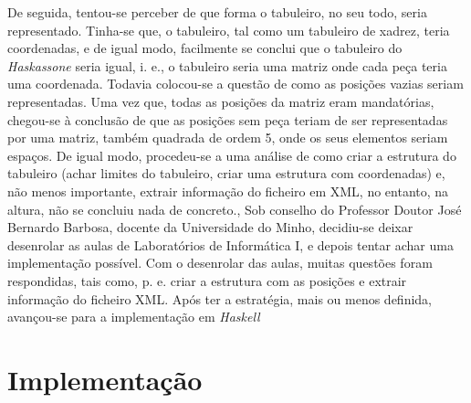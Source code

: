 De seguida,  tentou-se perceber de  que forma o  tabuleiro, no seu todo,  seria representado. Tinha-se  que, o
tabuleiro, tal como  um tabuleiro de xadrez, teria coordenadas,  e de igual modo, facilmente se  conclui que o
tabuleiro do  \emph{Haskassone} seria igual,  i. e., o  tabuleiro seria uma matriz  onde cada peça  teria uma
coordenada. Todavia colocou-se  a questão de como  as posições vazias seriam representadas.  Uma vez que,
todas as posições da matriz eram mandatórias, chegou-se à conclusão de que as posições sem peça teriam
de ser representadas por uma  matriz, também quadrada de ordem 5, onde os  seus elementos seriam espaços. De
igual modo,  procedeu-se a uma análise  de como criar a  estrutura do tabuleiro (achar  limites do tabuleiro,
criar uma  estrutura com coordenadas) e,  não menos importante, extrair  informação do ficheiro em  XML, no
entanto, na  altura, não  se concluiu  nada de  concreto., Sob  conselho do  Professor Doutor  José Bernardo
Barbosa,  docente  da Universidade  do  Minho,  decidiu-se deixar  desenrolar  as  aulas de  Laboratórios  de
Informática  I, e  depois tentar  achar uma  implementação possível.  Com o  desenrolar das  aulas, muitas
questões foram respondidas,  tais como, p. e. criar  a estrutura com as posições e  extrair informação do
ficheiro  XML. Após  ter  a  estratégia, mais  ou  menos definida,  avançou-se  para  a implementação  em
\emph{Haskell}


\section{Implementação}

